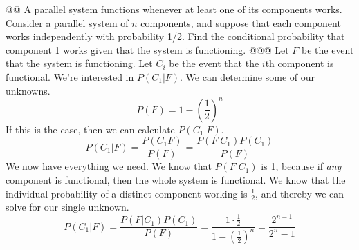 \documentclass[10pt]{article}
\begin{document}
\begin{easylist}[enumerate]
    @@ A parallel system functions whenever at least one of its components works. Consider a parallel system of $n$
    components, and suppose that each component works independently with probability 1/2.  Find the conditional
    probability that component 1 works given that the system is functioning.
    @@@ Let $F$ be the event that the system is functioning. Let $C_i$ be the event that the $i$th component is
    functional. We're interested in $P(C_1|F)$. We can determine some of our unknowns.
        \[ P(F) = 1 - { \left( \frac{1}{2} \right) }^n \]
    If this is the case, then we can calculate $P(C_1|F)$.
        \[ P(C_1|F) = \frac{P(C_1F)}{P(F)} = \frac{P(F|C_1)P(C_1)}{P(F)} \]
    We now have everything we need. We know that $P(F|C_1)$ is 1, because if \textit{any} component is functional, then
    the whole system is functional. We know that the individual probability of a distinct component working is
    $\frac{1}{2}$, and thereby we can solve for our single unknown.
        \[
            P(C_1|F) = \frac{P(F|C_1)P(C_1)}{P(F)} =
            \frac{1 \cdot \frac{1}{2} }
            {1-{\left(\frac{1}{2}\right)}^n} =
            \boxed{\frac{2^{n-1} }{2^n - 1} }
        \]


\end{easylist}
\end{document}
